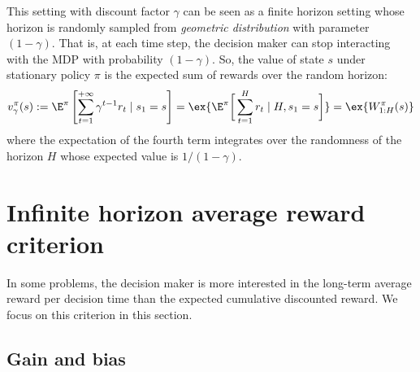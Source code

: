 This setting with discount factor $\gamma$ can be seen as a finite horizon setting whose horizon is randomly sampled from \emph{geometric distribution} with parameter $(1-\gamma)$.
That is, at each time step, the decision maker can stop interacting with the MDP with probability $(1-\gamma)$.
So, the value of state $s$ under stationary policy $\pi$ is the expected sum of rewards over the random horizon:
\begin{equation}
    \label{eq:discount_finite}
    v^\pi_\gamma(s) :=\E^\pi\left[\sum_{t=1}^{+\infty} \gamma^{t-1}r_t \mid s_1=s\right] =\ex{\E^\pi\bigg[\sum_{t=1}^H r_t\mid H, s_1=s\bigg]} =\ex{W^\pi_{1:H}(s)}
\end{equation}
where the expectation of the fourth term integrates over the randomness of the horizon $H$ whose expected value is $1/(1-\gamma)$.

\section{Infinite horizon average reward criterion}
\label{ch:mdp:sec:gain}

In some problems, the decision maker is more interested in the long-term average reward per decision time than the expected cumulative discounted reward.
We focus on this criterion in this section.

\subsection{Gain and bias}

